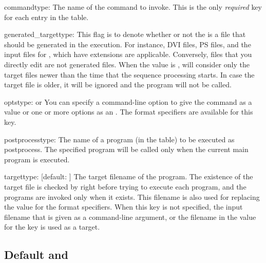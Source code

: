 \documentclass[draft]{llmk-doc}
\begin{document}
\begin{confkey}{command}{type: }
The name of the command to invoke. This is the only \emph{required} key for
each entry in the  table.
\end{confkey}

\begin{confkey}{generated\_target}{type: }
This flag is to denote whether or not the  is a file that should
be generated in the  execution. For instance, DVI files, PS files,
and the input files for , which have  extensions are
applicable. Conversely, files that you directly edit are not generated files.
When the value is ,  will consider only the target files
newer than the time that the sequence processing starts. In case the target
file is older, it will be ignored and the program will not be called.
\end{confkey}

\begin{confkey}{opts}{type:  or }
You can specify a command-line option to give the command as a 
value or one or more options as an . The format
specifiers are available for this key.
\end{confkey}

\begin{confkey}{postprocess}{type: }
The name of a program (in the  table) to be executed as
postprocess. The specified program will be called only when the current main
program is executed.
\end{confkey}

\begin{confkey}{target}{type: }[default: ]
The target filename of the program. The existence of the target file is checked
by  right before trying to execute each program, and the programs
are invoked only when it exists. This filename is also used for replacing the
value for the format specifiers. When this key is not specified, the input
filename that is given as a command-line argument, or the filename in the value
for the  key is used as a target.
\end{confkey}

\subsection{Default  and }
\end{document}
